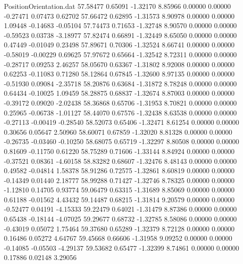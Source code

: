\begin{filecontents}{PositionOrientation.dat}
  57.58477    0.65091   -1.32170     8.85966    0.00000    0.00000   -0.27471    0.07473    0.62702
  57.66472    0.62895   -1.31573     8.90978    0.00000    0.00000    1.09448   -0.14683   -0.05104
  57.74473    0.71653   -1.32748     8.90570    0.00000    0.00000   -0.59523    0.03738   -3.18977
  57.82474    0.66891   -1.32449     8.65050    0.00000    0.00000    0.47449   -0.01049    0.23498
  57.89671    0.70306   -1.32524     8.66741    0.00000    0.00000   -0.58019   -0.00229    0.69625
  57.97672    0.65664   -1.32542     8.72311    0.00000    0.00000   -0.28717    0.09253    2.46257
  58.05670    0.63367   -1.31802     8.92008    0.00000    0.00000    0.62253   -0.11083    0.71280
  58.12864    0.67845   -1.32600     8.97135    0.00000    0.00000   -0.51930    0.09084   -2.35718
  58.20876    0.63684   -1.31872     8.78248    0.00000    0.00000    0.64434   -0.10025    1.09459
  58.28875    0.68837   -1.32674     8.87003    0.00000    0.00000   -0.39172    0.09020   -2.02438
  58.36868    0.65706   -1.31953     8.70821    0.00000    0.00000    0.25965   -0.06738   -1.01127
  58.44070    0.67576   -1.32438     8.63538    0.00000    0.00000   -0.27113   -0.00419   -0.28540
  58.52073    0.65406   -1.32471     8.61254    0.00000    0.00000    0.30656    0.05647    2.50960
  58.60071    0.67859   -1.32020     8.81328    0.00000    0.00000   -0.26735   -0.03460   -0.10250
  58.68075    0.65719   -1.32297     8.80508    0.00000    0.00000    0.81609   -0.11750    0.61220
  58.75289    0.71606   -1.33144     8.84924    0.00000    0.00000   -0.37521    0.08361   -4.60158
  58.83282    0.68607   -1.32476     8.48143    0.00000    0.00000    0.49582   -0.04814    1.58378
  58.91286    0.72575   -1.32861     8.60819    0.00000    0.00000   -0.14349    0.01440    2.18777
  58.99288    0.71427   -1.32746     8.78325    0.00000    0.00000   -1.12810    0.14705    0.93774
  59.06479    0.63315   -1.31689     8.85069    0.00000    0.00000    0.61188   -0.01562    4.43432
  59.14487    0.68215   -1.31814     9.20579    0.00000    0.00000   -0.52477    0.04191   -4.15333
  59.22479    0.64021   -1.31479     8.87386    0.00000    0.00000    0.65438   -0.18144   -4.07025
  59.29677    0.68732   -1.32785     8.58086    0.00000    0.00000   -0.43019    0.05072    1.75464
  59.37680    0.65289   -1.32379     8.72128    0.00000    0.00000    0.16486    0.05272    4.64767
  59.45668    0.66606   -1.31958     9.09252    0.00000    0.00000   -0.14085   -0.05503   -4.29137
  59.53682    0.65477   -1.32399     8.74861    0.00000    0.00000    0.17886    0.02148    3.29056

\end{filecontents}
